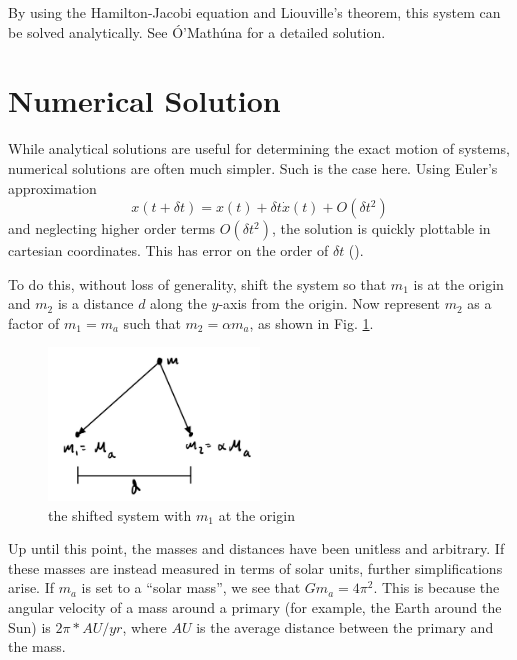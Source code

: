 \documentclass[preprint,titlepage,preprintnumbers,amsmath,amssymb,aps,11pt]{revtex4-2}
\begin{document}
By using the Hamilton-Jacobi equation and Liouville's theorem, this system can be solved analytically. See Ó'Mathúna \cite[pages 49-105 and 113-142]{OMathuna2008} for a detailed solution.

\section{Numerical Solution}
While analytical solutions are useful for determining the exact motion of systems, numerical solutions are often much simpler. Such is the case here. Using Euler's approximation
\begin{equation}
    x(t+\delta t)=x(t)+\delta t\dot{x}(t)+O(\delta t^2)
    \label{eq:eulersmethod}
\end{equation}
and neglecting higher order terms $O(\delta t^2)$, the solution is quickly plottable in cartesian coordinates. This has error on the order of $\delta t$ (\cite[p. 298]{Wild1980}).

To do this, without loss of generality, shift the system so that $m_1$ is at the origin and $m_2$ is a distance $d$ along the $y$-axis from the origin. Now represent $m_2$ as a factor of $m_1=m_a$ such that $m_2=\alpha m_a$, as shown in Fig. \ref{fig:shiftedsys}.
\begin{figure}
    \centering
    \includegraphics[width=0.5\textwidth]{Fig 3.jpeg}
    \caption{the shifted system with $m_1$ at the origin}
    \label{fig:shiftedsys}
\end{figure}

Up until this point, the masses and distances have been unitless and arbitrary. If these masses are instead measured in terms of solar units, further simplifications arise. If $m_a$ is set to a “solar mass”, we see that $Gm_a=4\pi^2$. This is because the angular velocity of a mass around a primary (for example, the Earth around the Sun) is $2\pi*AU/yr$, where $AU$ is the average distance between the primary and the mass.
\end{document}
